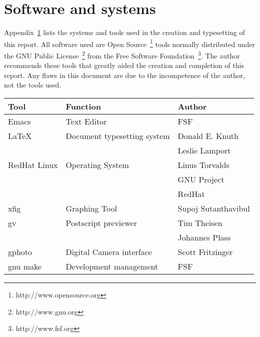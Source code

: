 \chapter{Software and systems}
\label{appendix:tools}

Appendix~\ref{appendix:tools} lists the systems and tools used in the
creation and typesetting of this report. All software used are Open
Source~\footnote{http://www.opensource.org} tools normally distributed
under the GNU Public License~\footnote{http://www.gnu.org} from the
Free Software Foundation~\footnote{http://www.fsf.org}. The author
recommends these tools that greatly aided the creation and completion
of this report. Any flaws in this document are due to the incompetence
of the author, not the tools used.

\begin{center}
\begin{tabular}[ht]{|l|l|l|} 	\hline	
	Tool & Function  & Author \\ \hline
	Emacs & Text Editor & FSF \\
	\LaTeX & Document typesetting system & Donald E. Knuth \\
	& &  Leslie Lamport \\ 
	RedHat Linux & Operating System & Linus Torvalds \\
	& &  GNU Project \\
	& &  RedHat \\
	xfig & Graphing Tool & Supoj Sutanthavibul\\
	gv & Postscript previewer & Tim Theisen \\
	& & Johannes Plass \\
	gphoto & Digital Camera interface & Scott Fritzinger \\
	gnu make & Development management & FSF \\
	\hline
\end{tabular}
\end{center}

